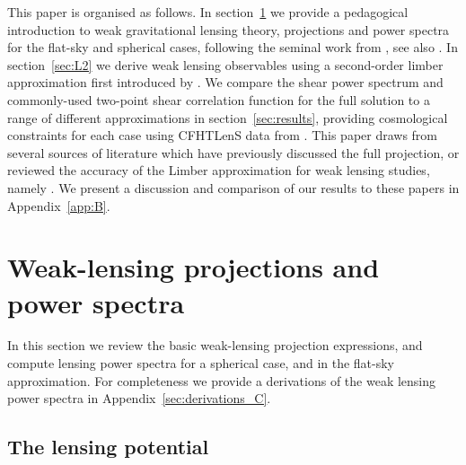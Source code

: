 \documentclass[fleqn,usenatbib]{mnras} %
\begin{document}
This paper is organised as follows.  In section~\ref{sec:wl} we provide a
pedagogical introduction to weak gravitational lensing theory, projections and
power spectra for the flat-sky and spherical cases, following the seminal work
from \citet{2000PhRvD..62d3007H}, see also \citet{2005PhRvD..72b3516C}. In section~\ref{sec:L2} we
derive weak lensing observables using a second-order limber approximation first
introduced by \citet{2008PhRvD..78l3506L}. We compare the shear power spectrum
and commonly-used two-point shear correlation function for the full solution to
a range of different approximations in section~\ref{sec:results}, providing
cosmological constraints for each case using CFHTLenS data from
\citet{CFHTLenS-2pt-notomo}. This paper draws
from several sources of literature which have previously discussed the full
projection, or reviewed the accuracy of the Limber approximation for weak
lensing studies, namely \citet{2008PhRvD..78d3002S,2012PhRvD..86b3001B,
2012MNRAS.422.2854G, 2016arXiv161104954K}. We present a discussion and
comparison of our results to these papers in Appendix~\ref{app:B}.


\section{Weak-lensing projections and power spectra}
\label{sec:wl}

In this section we review the basic weak-lensing projection expressions, and
compute lensing power spectra for a spherical case, and in the flat-sky
approximation. For completeness we provide a derivations of the weak lensing power spectra in Appendix~\ref{sec:derivations_C}.

\subsection{The lensing potential}
\label{sec:psi}
\end{document}
